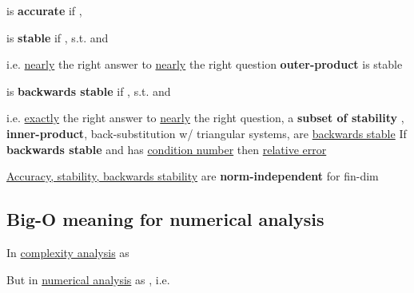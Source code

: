  is \textbf{accurate} if ,

 is \textbf{stable} if ,
 s.t.
and

\begin{itemize}

      \vItem
            i.e. \ul{nearly} the right answer to \ul{nearly} the right question
      \vItem
            \textbf{outer-product} is stable
\end{itemize}

\columnbreak

 is \textbf{backwards stable} if
,  s.t.
 and

\begin{itemize}

      \vItem
            i.e. \ul{exactly} the right answer to \ul{nearly} the right question,
            a \textbf{subset of stability}
      \vItem
            \iMbox{\oplus, \ominus, \otimes, \oslash}, \textbf{inner-product},
            back-substitution w/ triangular systems, are \ul{backwards stable}
      \vItem
            If \textbf{backwards stable}  and  has
            \ul{condition number}  then \ul{relative error}
\end{itemize}

\ul{Accuracy, stability, backwards stability} are \textbf{norm-independent} for fin-dim 

\subsection*{Big-O meaning for numerical analysis}

In \ul{complexity analysis}  as 

But in \ul{numerical analysis}  as ,
i.e. 

